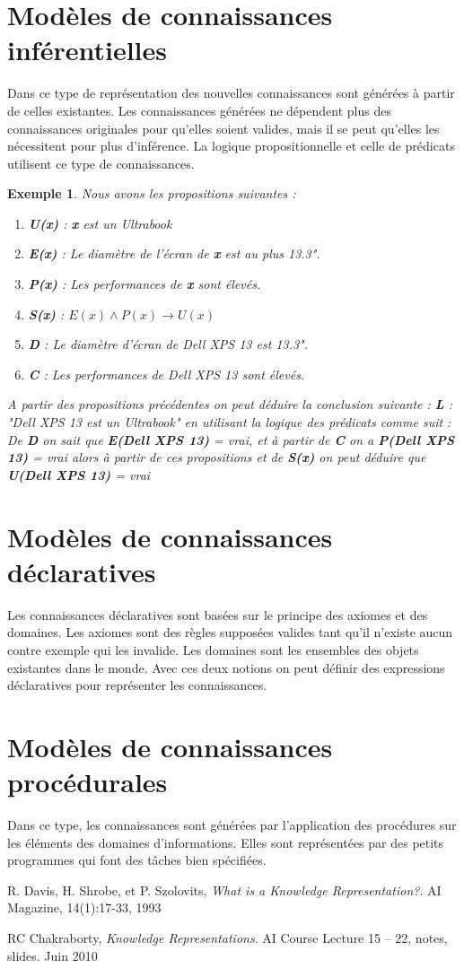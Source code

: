 \documentclass[12pt,a4paper]{report}
\newtheorem{example}{Exemple}
\begin{document}
\section{Modèles de connaissances inférentielles}
Dans ce type de représentation des nouvelles connaissances sont générées à partir de celles existantes.
Les connaissances générées ne dépendent plus des connaissances originales pour qu'elles soient valides, mais
il se peut qu'elles les nécessitent pour plus d'inférence.\cite{KRC} La logique propositionnelle et celle de
prédicats utilisent ce type de connaissances.

\begin{example}
Nous avons les propositions suivantes :
\begin{enumerate}
\item \textbf{U(x)} : \textbf{x} est un Ultrabook
\item \textbf{E(x)} : Le diamètre de l'écran de \textbf{x} est au plus 13.3".
\item \textbf{P(x)} : Les performances de \textbf{x} sont élevés.
\item \textbf{S(x)} : $ E(x) \wedge P(x) \rightarrow U(x) $
\item \textbf{D} : Le diamètre d'écran de Dell XPS 13 est 13.3".
\item \textbf{C} : Les performances de Dell XPS 13 sont élevés.
\end{enumerate}
A partir des propositions précédentes on peut déduire la conclusion suivante :
\textbf{L} : "Dell XPS 13 est un Ultrabook"  en utilisant la logique des prédicats comme suit :
De \textbf{D} on sait que \textbf{E(Dell XPS 13)} = vrai, et à partir de \textbf{C} on a \textbf{P(Dell XPS 13)} = vrai
alors à partir de ces propositions et de \textbf{S(x)} on peut déduire que \textbf{U(Dell XPS 13)} = vrai
\end{example}

\section{Modèles de connaissances déclaratives}
Les connaissances déclaratives sont basées sur le principe des axiomes et des domaines. Les axiomes sont des règles
supposées valides tant qu'il n'existe aucun contre exemple qui les invalide. Les domaines sont les ensembles des objets
existantes dans le monde. Avec ces deux notions on peut définir des expressions déclaratives pour représenter les
connaissances.\cite{KRC}

\section{Modèles de connaissances procédurales}
Dans ce type, les connaissances sont générées par l'application des procédures sur les éléments des domaines d'informations.
Elles sont représentées par des petits programmes qui font des tâches bien spécifiées.\cite{KRC}

\begin{thebibliography}{9}
R. Davis, H. Shrobe, et P. Szolovits,
\emph{What is a Knowledge Representation?}.
AI Magazine, 14(1):17-33, 1993

RC Chakraborty,
\emph{Knowledge Representations}.
AI Course Lecture 15 – 22, notes, slides. Juin 2010 
\end{thebibliography}
\end{document}
